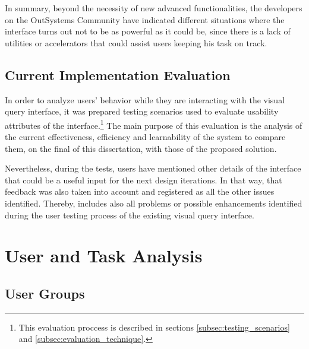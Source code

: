 In summary, beyond the necessity of new advanced functionalities, the developers on the OutSystems Community have indicated different situations where the interface turns out not to be as powerful as it could be, since there is a lack of utilities or accelerators that could assist users keeping his task on track.

\subsection{Current Implementation Evaluation}
\label{sec:current_implementation_evaluation}

In order to analyze users' behavior while they are interacting with the visual query interface, it was prepared testing scenarios used to evaluate usability attributes of the interface.\footnote{This evaluation proccess is described in sections \ref{subsec:testing_scenarios} and \ref{subsec:evaluation_technique}.} The main purpose of this evaluation is the analysis of the current effectiveness, efficiency and learnability of the system to compare them, on the final of this dissertation, with those of the proposed solution. 

Nevertheless, during the tests, users have mentioned other details of the interface that could be a useful input for the next design iterations. In that way, that feedback was also taken into account and registered as all the other issues identified. Thereby,  includes also all problems or possible enhancements identified during the user testing process of the existing visual query interface.


\section{User and Task Analysis}
\label{sec:user_and_task_analysis}

\subsection{User Groups}
\label{subsec:user_groups}


